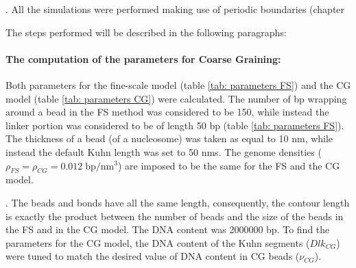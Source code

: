. All the simulations were performed making use of periodic boundaries (chapter %

The steps performed will be described in the following paragraphs:


\paragraph{The computation of the parameters for Coarse Graining:}

Both parameters for the fine-scale model (table \ref{tab: parameters FS}) and the CG model (table \ref{tab: parameters CG}) were calculated. The number of bp wrapping around a bead in the FS method was considered to be 150, while instead the linker portion was considered to be of length 50 bp (table \ref{tab: parameters FS}). The thickness of a bead (of a nucleosome) was taken as equal to 10 nm, while instead the default Kuhn length was set to 50 nms. The genome densities ($\rho_{FS} = \rho_{CG} = 0.012\; \text{bp}/\text{nm}^3$) are imposed to be the same for the FS and the CG model.

.
The beads and bonds have all the same length, consequently, the contour length is exactly the product between the number of beads and the size of the beads in the FS and in the CG model. The DNA content was 2000000 bp. To find the parameters for the CG model, the DNA content of the Kuhn segments ($Dlk_{CG}$) were tuned to match the desired value of DNA content in CG beads ($\nu_{CG}$).


